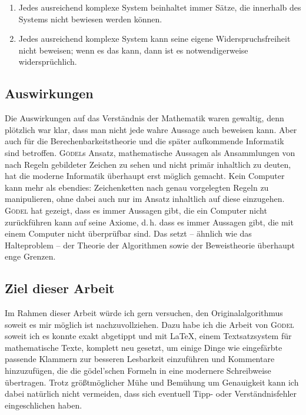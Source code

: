 \begin{enumerate}
	\item Jedes ausreichend komplexe System beinhaltet immer Sätze, die innerhalb
		des Systems nicht bewiesen werden können.
	\item Jedes ausreichend komplexe System kann seine eigene Widerspruchsfreiheit
		nicht beweisen; wenn es das kann, dann ist es
		notwendigerweise widersprüchlich.
\end{enumerate}

\subsection*{Auswirkungen}

Die Auswirkungen auf das Verständnis der Mathematik waren gewaltig, denn plötzlich war klar,
dass man nicht jede wahre Aussage auch beweisen kann. Aber auch für die Berechenbarkeitstheorie
und die später aufkommende Informatik sind betroffen. \textsc{Gödel}s Ansatz, mathematische
Aussagen als Ansammlungen von nach Regeln gebildeter Zeichen zu sehen und nicht primär
inhaltlich zu deuten, hat die moderne Informatik überhaupt erst möglich gemacht.
Kein Computer kann mehr als ebendies: Zeichenketten nach genau vorgelegten Regeln
zu manipulieren, ohne dabei auch nur im Ansatz inhaltlich auf diese einzugehen. \textsc{Gödel} hat
gezeigt, dass es immer Aussagen gibt, die ein Computer nicht zurückführen kann auf
seine Axiome, d.\,h. dass es immer Aussagen gibt, die mit einem Computer nicht überprüfbar sind.
Das setzt -- ähnlich wie das Halteproblem -- der Theorie der Algorithmen sowie
der Beweistheorie überhaupt enge Grenzen.

\subsection*{Ziel dieser Arbeit}

Im Rahmen dieser Arbeit würde ich gern versuchen, den Originalalgorithmus soweit
es mir möglich ist nachzuvollziehen. Dazu habe ich die Arbeit von \textsc{Gödel} soweit ich
es konnte exakt abgetippt und mit \LaTeX, einem Textsatzsystem für mathematische
Texte, komplett neu gesetzt, um einige Dinge wie eingefärbte passende Klammern zur besseren
Lesbarkeit einzuführen und Kommentare hinzuzufügen, die die gödel'schen Formeln in eine modernere
Schreibweise übertragen. Trotz größtmöglicher Mühe und Bemühung um Genauigkeit
kann ich dabei natürlich nicht vermeiden, dass sich eventuell Tipp- oder Verständnisfehler
eingeschlichen haben.


